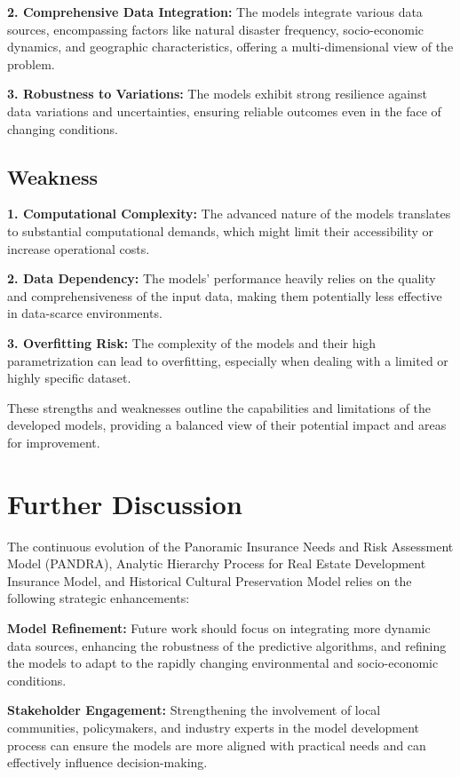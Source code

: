 \documentclass{mcmthesis}
\begin{document}
\textbf{2. Comprehensive Data Integration:} The models integrate various data sources, encompassing factors like natural disaster frequency, socio-economic dynamics, and geographic characteristics, offering a multi-dimensional view of the problem.

\textbf{3. Robustness to Variations:} The models exhibit strong resilience against data variations and uncertainties, ensuring reliable outcomes even in the face of changing conditions.

\subsection{Weakness}

\textbf{1. Computational Complexity:} The advanced nature of the models translates to substantial computational demands, which might limit their accessibility or increase operational costs.

\textbf{2. Data Dependency:} The models' performance heavily relies on the quality and comprehensiveness of the input data, making them potentially less effective in data-scarce environments.

\textbf{3. Overfitting Risk:} The complexity of the models and their high parametrization can lead to overfitting, especially when dealing with a limited or highly specific dataset.

These strengths and weaknesses outline the capabilities and limitations of the developed models, providing a balanced view of their potential impact and areas for improvement.
\section{Further Discussion}
The continuous evolution of the Panoramic Insurance Needs and Risk Assessment Model (PANDRA), Analytic Hierarchy Process for Real Estate Development Insurance Model, and Historical Cultural Preservation Model relies on the following strategic enhancements:

\textbf{Model Refinement:} Future work should focus on integrating more dynamic data sources, enhancing the robustness of the predictive algorithms, and refining the models to adapt to the rapidly changing environmental and socio-economic conditions.

\textbf{Stakeholder Engagement:} Strengthening the involvement of local communities, policymakers, and industry experts in the model development process can ensure the models are more aligned with practical needs and can effectively influence decision-making.
\end{document}
